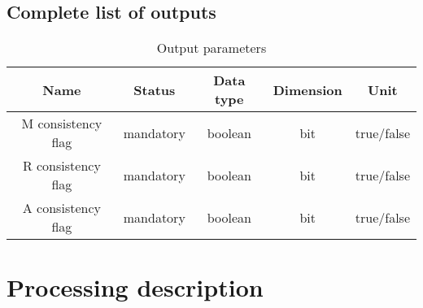 \documentclass[a4paper, oneside, 11pt, article, english]{memoir}
\begin{document}
\section{Complete list of outputs}
\label{sec:output}

\iffalse
{
  \itshape
  A comprehensive list of outputs must be provided in the table. For each output,
  the following information is needed

  \begin{description}
    \firmlist
  \item[Name] the name must follow the nomenclature as defined by WP120 Data
    Products Definition Document [RD3].
  \item[Status] specify if this data is \emph{mandatory} or \emph{optional} to run the algorithm.
  \item[Data type] see \cref{sec:nomenclature} for the standard definitions
  \item[Dimension] specify the dimension of the data (e.g; the dimension of a scalar is 0, of an array 1, etc).
  \item[Unit] provide the unit of the data and the data-system of units (cgs or mks).
  \end{description}
}
\fi

\begin{table}[htbp]
  \centering
  \caption{Output parameters}
  \label{tab:output}
  \begin{tabular}{ccccc}
    \toprule
    Name & Status & Data type & Dimension & Unit \\
    \midrule
    M consistency flag & mandatory & boolean & bit & true/false \\
    R consistency flag & mandatory & boolean & bit & true/false \\
    A consistency flag & mandatory & boolean & bit & true/false \\
    \bottomrule
  \end{tabular}
\end{table}


\clearpage
\chapter{Processing description}
\label{chap:processing}
\end{document}
